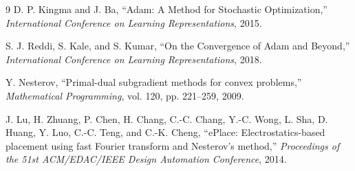 \documentclass[UTF8,a4paper,11pt]{ctexart}
\begin{document}
\begin{thebibliography}{9}
D. P. Kingma and J. Ba,
``Adam: A Method for Stochastic Optimization,''
\textit{International Conference on Learning Representations}, 2015.

S. J. Reddi, S. Kale, and S. Kumar,
``On the Convergence of Adam and Beyond,''
\textit{International Conference on Learning Representations}, 2018.

Y. Nesterov,
``Primal-dual subgradient methods for convex problems,''
\textit{Mathematical Programming}, vol. 120, pp. 221--259, 2009.

J. Lu, H. Zhuang, P. Chen, H. Chang, C.-C. Chang, Y.-C. Wong, L. Sha, D. Huang, Y. Luo,
C.-C. Teng, and C.-K. Cheng,
``ePlace: Electrostatics-based placement using fast Fourier transform and Nesterov's method,''
\textit{Proceedings of the 51st ACM/EDAC/IEEE Design Automation Conference}, 2014.
\end{thebibliography}
\end{document}
